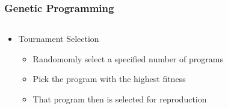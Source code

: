 \documentclass{beamer}
\begin{document}
\begin{frame}
	\frametitle{Genetic Programming}

\begin{columns}[T]

\begin{column}{0.5\textwidth}

\begin{itemize}
	\item Tournament Selection
	\\
	\begin{itemize}
	\item Randomomly select a specified number of programs
	\item Pick the program with the highest fitness
	\item That program then is selected for reproduction
	
	\end{itemize}
	

\end{itemize}
\end{column}
\end{columns}
\end{frame}
\end{document}
